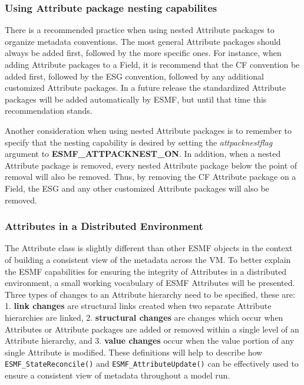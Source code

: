 \subsubsection{Using Attribute package nesting capabilites}

There is a recommended practice when using nested Attribute packages to organize metadata conventions.  The most general Attribute packages should always be added first, followed by the more specific ones.  For instance, when adding Attribute packages to a Field, it is recommend that the CF convention be added first, followed by the ESG convention, followed by any additional customized Attribute packages.  In a future release the standardized Attribute packages will be added automatically by ESMF, but until that time this recommendation stands.

Another consideration when using nested Attribute packages is to remember to specify that the nesting capability is desired by setting the {\it attpacknestflag} argument to {\bf ESMF\_ATTPACKNEST\_ON}.  In addition, when a nested Attribute package is removed, every nested Attribute package below the point of removal will also be removed.  Thus, by removing the CF Attribute package on a Field, the ESG and any other customized Attribute packages will also be removed.

\subsubsection{Attributes in a Distributed Environment}
\label{sec:Att:Dist}

The Attribute class is slightly different than other ESMF objects in the context of building a consistent view of the metadata across the VM.  To better explain the ESMF capabilities for ensuring the integrity of Attributes in a distributed environment, a small working vocabulary of ESMF Attributes will be presented.  Three types of changes to an Attribute hierarchy need to be specified, these are: 1. {\bf link changes} are structural links created when two separate Attribute hierarchies are linked, 2. {\bf structural changes} are changes which occur when Attributes or Attribute packages are added or removed within a single level of an Attribute hierarchy, and 3. {\bf value changes} occur when the value portion of any single Attribute is modified.  These definitions will help to describe how {\tt ESMF\_StateReconcile()} and {\tt ESMF\_AttributeUpdate()} can be effectively used to ensure a consistent view of metadata throughout a model run.

